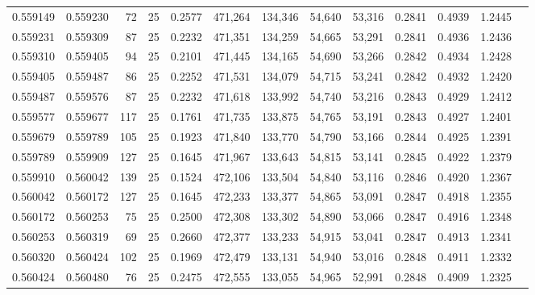 \begin{tabular}{rrrrrrrrrrrrr}
0.559149 & 0.559230 &    72 &  25 &                                     0.2577 & 471,264 & 134,346 &  54,640 &  53,316 & 0.2841 & 0.4939 & 1.2445 \\
0.559231 & 0.559309 &    87 &  25 &                                     0.2232 & 471,351 & 134,259 &  54,665 &  53,291 & 0.2841 & 0.4936 & 1.2436 \\
0.559310 & 0.559405 &    94 &  25 &                                     0.2101 & 471,445 & 134,165 &  54,690 &  53,266 & 0.2842 & 0.4934 & 1.2428 \\
0.559405 & 0.559487 &    86 &  25 &                                     0.2252 & 471,531 & 134,079 &  54,715 &  53,241 & 0.2842 & 0.4932 & 1.2420 \\
0.559487 & 0.559576 &    87 &  25 &                                     0.2232 & 471,618 & 133,992 &  54,740 &  53,216 & 0.2843 & 0.4929 & 1.2412 \\
0.559577 & 0.559677 &   117 &  25 &                                     0.1761 & 471,735 & 133,875 &  54,765 &  53,191 & 0.2843 & 0.4927 & 1.2401 \\
0.559679 & 0.559789 &   105 &  25 &                                     0.1923 & 471,840 & 133,770 &  54,790 &  53,166 & 0.2844 & 0.4925 & 1.2391 \\
0.559789 & 0.559909 &   127 &  25 &                                     0.1645 & 471,967 & 133,643 &  54,815 &  53,141 & 0.2845 & 0.4922 & 1.2379 \\
0.559910 & 0.560042 &   139 &  25 &                                     0.1524 & 472,106 & 133,504 &  54,840 &  53,116 & 0.2846 & 0.4920 & 1.2367 \\
0.560042 & 0.560172 &   127 &  25 &                                     0.1645 & 472,233 & 133,377 &  54,865 &  53,091 & 0.2847 & 0.4918 & 1.2355 \\
0.560172 & 0.560253 &    75 &  25 &                                     0.2500 & 472,308 & 133,302 &  54,890 &  53,066 & 0.2847 & 0.4916 & 1.2348 \\
0.560253 & 0.560319 &    69 &  25 &                                     0.2660 & 472,377 & 133,233 &  54,915 &  53,041 & 0.2847 & 0.4913 & 1.2341 \\
0.560320 & 0.560424 &   102 &  25 &                                     0.1969 & 472,479 & 133,131 &  54,940 &  53,016 & 0.2848 & 0.4911 & 1.2332 \\
0.560424 & 0.560480 &    76 &  25 &                                     0.2475 & 472,555 & 133,055 &  54,965 &  52,991 & 0.2848 & 0.4909 & 1.2325 \\

\end{tabular}

